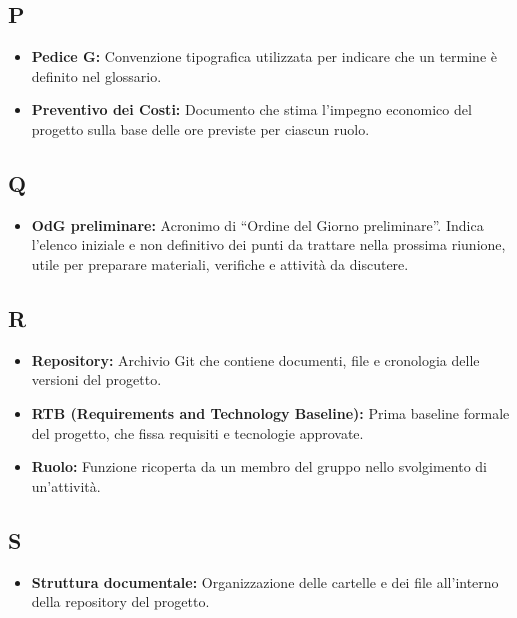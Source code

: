 \subsection*{P}
\begin{itemize}[leftmargin=*]
    \item \textbf{Pedice G:} Convenzione tipografica utilizzata per indicare che un termine è definito nel glossario.
    \item \textbf{Preventivo dei Costi:} Documento che stima l’impegno economico del progetto sulla base delle ore previste per ciascun ruolo.
\end{itemize}

{}
\subsection*{Q}
\begin{itemize}[leftmargin=*]
	\item \textbf{OdG preliminare:} Acronimo di “Ordine del Giorno preliminare”. Indica l’elenco iniziale e non definitivo dei punti da trattare nella prossima riunione, utile per preparare materiali, verifiche e attività da discutere.
\end{itemize}

{}
\subsection*{R}
\begin{itemize}[leftmargin=*]
    \item \textbf{Repository:} Archivio Git che contiene documenti, file e cronologia delle versioni del progetto.
    \item \textbf{RTB (Requirements and Technology Baseline):} Prima baseline formale del progetto, che fissa requisiti e tecnologie approvate.
    \item \textbf{Ruolo:} Funzione ricoperta da un membro del gruppo nello svolgimento di un’attività.
\end{itemize}

{}
\subsection*{S}
\begin{itemize}[leftmargin=*]
    \item \textbf{Struttura documentale:} Organizzazione delle cartelle e dei file all’interno della repository del progetto.
\end{itemize}

